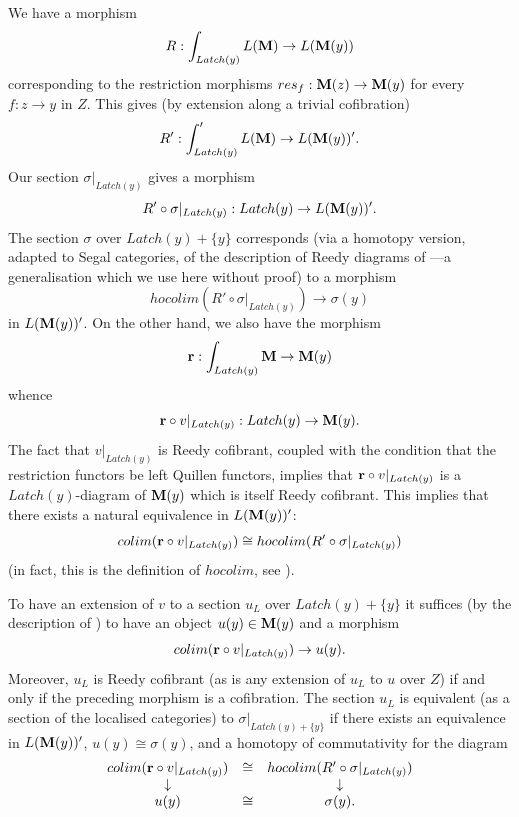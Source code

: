 We have a morphism
$$
R: \int _{Latch(y)}L({\bf M} )\rightarrow L({\bf M} (y))
$$
corresponding to the
restriction morphisms $res_f: {\bf M} (z)\rightarrow {\bf M} (y)$
for every $f:z\rightarrow y$ in $Z$. This gives
(by extension along a trivial cofibration)
$$
R': \int '_{Latch(y)}L({\bf M} )\rightarrow L({\bf M} (y))' .
$$
Our section $\sigma |_{Latch (y)}$ gives a morphism
$$
R'\circ \sigma |_{Latch(y)} : Latch (y) \rightarrow L({\bf M} (y))'.
$$
The section $\sigma$ over $Latch(y)+ \{ y\}$ corresponds
(via a homotopy version, adapted to Segal categories, of the description of
Reedy diagrams of \cite{Hirschhorn} \cite{DHK}---a generalisation which
we use here without proof) to a morphism
$$
hocolim (R'\circ \sigma |_{Latch(y)})\rightarrow \sigma (y)
$$
in $L({\bf M} (y))'$. On the other hand, we also have the morphism
$$
{\bf r}: \int _{Latch(y)}{\bf M} \rightarrow {\bf M} (y)
$$
whence
$$
{\bf r}\circ v|_{Latch (y)}: Latch(y)\rightarrow {\bf M} (y).
$$
The fact that $v|_{Latch(y)}$ is Reedy cofibrant, coupled with the condition
that the restriction functors be left Quillen functors,
implies that ${\bf r}\circ v|_{Latch (y)}$ is a $Latch(y)$-diagram of
${\bf M} (y)$ which is itself Reedy cofibrant. This implies that there exists a
natural equivalence in $L({\bf M} (y))'$:
$$
colim ({\bf r}\circ v|_{Latch (y)}) \cong
hocolim (R'\circ \sigma |_{Latch(y)})
$$
(in fact, this is the definition of $hocolim$, see \cite{BousfieldKan}
\cite{Hirschhorn} \cite{DHK}).

To have an extension of $v$ to a section $u_L$
over $Latch (y)+ \{ y\}$ it suffices (by the description of
\cite{Hirschhorn} \cite{DHK}) to have an object $u(y)\in {\bf M} (y)$ and a
morphism
$$
colim ({\bf r}\circ v|_{Latch (y)})\rightarrow u(y).
$$
Moreover, $u_L$ is Reedy cofibrant (as is any extension of $u_L$ to $u$
over $Z$) if and only if the preceding morphism is a
cofibration. The section $u_L$ is equivalent
(as a section of the localised categories)
to $\sigma |_{Latch(y)+ \{ y\}}$ if there exists an equivalence in
$L({\bf M} (y))'$, $u(y)\cong \sigma (y)$, and a homotopy of commutativity for
the diagram
$$
\begin{array}{ccc}
colim ({\bf r}\circ v|_{Latch (y)})
& \cong & hocolim (R'\circ \sigma |_{Latch(y)})\\
\downarrow && \downarrow \\
u(y) & \cong & \sigma (y).
\end{array}
$$

